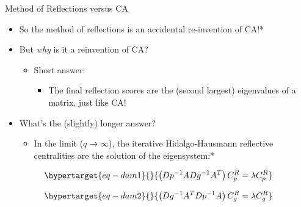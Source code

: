 \documentclass[
  ignorenonframetext,
]{beamer}
\providecommand{\tightlist}{%
  \setlength{\itemsep}{0pt}\setlength{\parskip}{0pt}}\usepackage{longtable,booktabs,array}
\begin{document}
\begin{frame}{Method of Reflections versus CA}
\protect\hypertarget{method-of-reflections-versus-ca-1}{}
\begin{itemize}
\item
  So the method of reflections is an accidental re-invention of CA!*
\item
  But \emph{why} is it a reinvention of CA?

  \begin{itemize}
  \tightlist
  \item
    Short answer:

    \begin{itemize}
    \tightlist
    \item
      The final reflection scores are the (second largest) eigenvalues
      of a matrix, just like CA!
    \end{itemize}
  \end{itemize}
\item
  What's the (slightly) longer answer?

  \begin{itemize}
  \tightlist
  \item
    In the limit (\(q \rightarrow \infty\)), the iterative
    Hidalgo-Hausmann reflective centralities are the solution of the
    eigensystem:*
  \end{itemize}
\end{itemize}

\begin{equation}\protect\hypertarget{eq-dam1}{}{
\left(Dp^{-1}ADg^{-1}A^T\right)C^R_p = \lambda C^R_p
}\label{eq-dam1}\end{equation}

\begin{equation}\protect\hypertarget{eq-dam2}{}{
\left(Dg^{-1}A^TDp^{-1}A\right)C^R_g = \lambda C^R_g
}\label{eq-dam2}\end{equation}

\end{frame}
\end{document}
